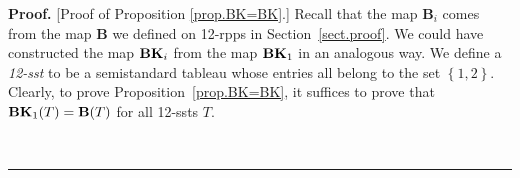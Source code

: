 \documentclass[12pt]{article}
\theoremstyle{plain}
\theoremstyle{definition}
\newtheorem{example}[theorem]{Example}
\newenvironment{proof}[1][Proof]{\noindent\textbf{#1.} }{\ \rule{0.5em}{0.5em}}
\begin{document}
\begin{proof}
[Proof of Proposition \ref{prop.BK=BK}.] 
Recall that the map $\mathbf{B}_i$ comes from the map $\mathbf{B}$ we defined on 12-rpps in Section~\ref{sect.proof}.
We could have constructed the map ${\mathbf{BK}}_i$ from the map ${\mathbf{BK}}_1$ in an analogous way.
We define a \textit{12-sst} to be a semistandard tableau whose entries all belong to the set $\left\{  1,2\right\}  $.
Clearly, to prove Proposition~\ref{prop.BK=BK}, it suffices to prove that ${\mathbf{BK}}_1(T) = \mathbf{B}(T)$ for all 12-ssts $T$.


\end{proof}
\end{document}
